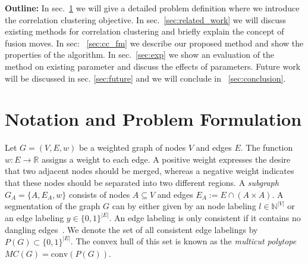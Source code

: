 \documentclass[10pt,twocolumn,letterpaper]{article}
\begin{document}

\textbf{Outline:}
In sec.~\ref{sec:problem_formulation} we will give a 
detailed problem definition where we introduce 
the correlation clustering objective.
In sec.~\ref{sec:related_work} we will 
discuss existing methods for correlation 
clustering and briefly explain the concept of fusion moves.
In sec: ~\ref{sec:cc_fm} we describe our proposed
method and show the properties of the algorithm.
In sec.~\ref{sec:exp} we show an evaluation
of the method on existing parameter  and discuss the effects of parameters.
Future work will be discussed in sec. \ref{sec:future} and
we will conclude in ~\ref{sec:conclusion}.

\section{Notation and Problem Formulation}\label{sec:problem_formulation}
Let $G=(V,E, w)$ be a weighted graph of nodes $V$ and edges $E$.
%
The function $w : E \rightarrow \mathbb{R}$ assigns a weight to each edge.
A positive weight expresses the desire that two adjacent nodes should
be merged, whereas a negative weight indicates
that these nodes should be separated into two different regions.
%
A \emph{subgraph} $G_A = \{A, E_A, w\}$ consists
of nodes $A \subseteq V$ and edges $E_A := E\cap (A\times A)$.
%
A segmentation of the graph $G$ can by either given by an 
node labeling $l \in \mathbb{N}^{|V|}$
or an edge labeling $y \in\{0,1\}^{|E|}$.  
An edge labeling is only consistent if it contains no dangling edges~\cite{Kappes-2013-multicut}.
We denote the set of all consistent edge labelings by $P(G)\subset\{0,1\}^{|E|}$.
The convex hull of this set is known as the \emph{multicut polytope} $MC(G) = \textrm{conv}(P(G))$.
\end{document}

